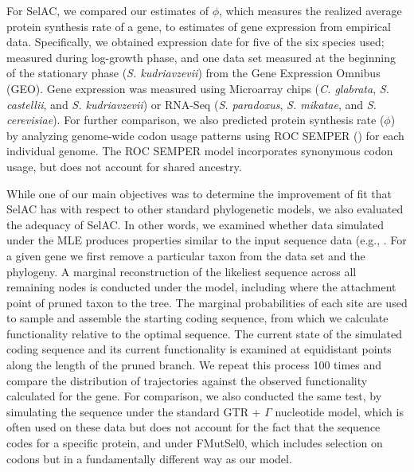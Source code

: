 \documentclass{article}
\newcommand{\selac}{SelAC\xspace}
\begin{document}
For SelAC, we compared our estimates of $\phi$, which measures the realized average protein synthesis rate of a gene, to estimates of gene expression from empirical data.
Specifically, we obtained expression date for five of the six species used; measured during log-growth phase, and one data set measured at the beginning of the stationary phase (\emph{S. kudriavzevii}) from the Gene Expression Omnibus (GEO). 
Gene expression was measured using Microarray chips (\emph{C. glabrata}, \emph{S. castellii}, and \emph{S. kudriavzevii}) or RNA-Seq (\emph{S. paradoxus}, \emph{S. mikatae}, and \emph{S. cerevisiae}).
For further comparison, we also predicted protein synthesis rate ($\phi$) by analyzing genome-wide codon usage patterns using ROC SEMPER (\citet{GilchristEtAl2015}) for each individual genome.
The ROC SEMPER model incorporates synonymous codon usage, but does not account for shared ancestry.

While one of our main objectives was to determine the improvement of fit that \selac has with respect to other standard phylogenetic models, we also evaluated the adequacy of \selac.
In other words, we examined whether data simulated under the MLE produces properties similar to the input sequence data (e.g., \citet{BeaulieuEtAl2013}.
For a given gene we first remove a particular taxon from the data set and the phylogeny.
A marginal reconstruction of the likeliest sequence across all remaining nodes is conducted under the model, including where the attachment point of pruned taxon to the tree.
The marginal probabilities of each site are used to sample and assemble the starting coding sequence, from which we calculate functionality relative to the optimal sequence.
The current state of the simulated coding sequence and its current functionality is examined at equidistant points along the length of the pruned branch.
We repeat this process 100 times and compare the distribution of trajectories against the observed functionality calculated for the gene.
For comparison, we also conducted the same test, by simulating the sequence under the standard GTR + $\Gamma$ nucleotide model, which is often used on these data but does not account for the fact that the sequence codes for a specific protein, and under FMutSel0, which includes selection on codons but in a fundamentally different way as our model.



\end{document}
